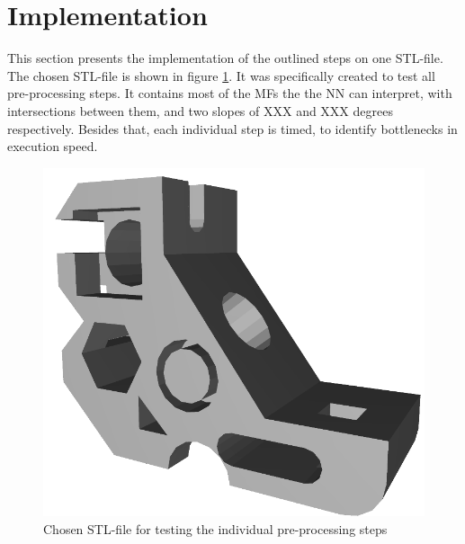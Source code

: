 \documentclass[conference]{IEEEtran}
\begin{document}
\section{Implementation}
This section presents the implementation of the outlined steps on one STL-file.
The chosen STL-file is shown in figure \ref{fig:STLfile}. It was specifically created to test all pre-processing steps. It contains most of the MFs the the NN can interpret, with intersections between them, and two slopes of XXX and XXX degrees respectively. Besides that, each individual step is timed, to identify bottlenecks in execution speed.
  \begin{figure}[H]
  	\begin{center}
  		\includegraphics[width=0.6\linewidth]{pictures/STLfile.png}
  		\caption{Chosen STL-file for testing the individual pre-processing steps}
  		\label{fig:STLfile}
  	\end{center}
  \end{figure}
\end{document}
